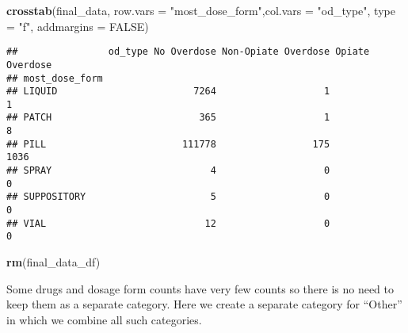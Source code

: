 \documentclass[]{article}
\newenvironment{Shaded}{\begin{snugshade}}{\end{snugshade}}
\newcommand{\KeywordTok}[1]{\textcolor[rgb]{0.13,0.29,0.53}{\textbf{#1}}}
\newcommand{\DataTypeTok}[1]{\textcolor[rgb]{0.13,0.29,0.53}{#1}}
\newcommand{\FloatTok}[1]{\textcolor[rgb]{0.00,0.00,0.81}{#1}}
\newcommand{\StringTok}[1]{\textcolor[rgb]{0.31,0.60,0.02}{#1}}
\newcommand{\OtherTok}[1]{\textcolor[rgb]{0.56,0.35,0.01}{#1}}
\newcommand{\OperatorTok}[1]{\textcolor[rgb]{0.81,0.36,0.00}{\textbf{#1}}}
\newcommand{\NormalTok}[1]{#1}
\begin{document}
\begin{Shaded}
\begin{Highlighting}[]
\KeywordTok{crosstab}\NormalTok{(final_data, }\DataTypeTok{row.vars =} \StringTok{"most_dose_form"}\NormalTok{,}\DataTypeTok{col.vars =} \StringTok{"od_type"}\NormalTok{, }\DataTypeTok{type =} \StringTok{"f"}\NormalTok{, }\DataTypeTok{addmargins =} \OtherTok{FALSE}\NormalTok{)}
\end{Highlighting}
\end{Shaded}

\begin{verbatim}
##                od_type No Overdose Non-Opiate Overdose Opiate Overdose
## most_dose_form                                                        
## LIQUID                        7264                   1               1
## PATCH                          365                   1               8
## PILL                        111778                 175            1036
## SPRAY                            4                   0               0
## SUPPOSITORY                      5                   0               0
## VIAL                            12                   0               0
\end{verbatim}

\begin{Shaded}
\begin{Highlighting}[]
\KeywordTok{rm}\NormalTok{(final_data_df)}
\end{Highlighting}
\end{Shaded}

Some drugs and dosage form counts have very few counts so there is no
need to keep them as a separate category. Here we create a separate
category for ``Other'' in which we combine all such categories.

\begin{Shaded}
\end{Shaded}
\end{document}
